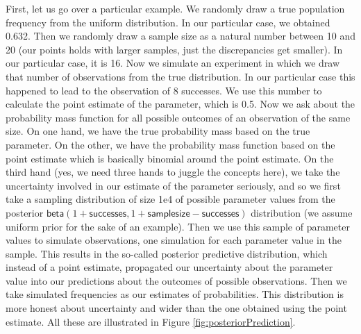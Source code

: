 \documentclass[
  10pt,
  dvipsnames,enabledeprecatedfontcommands]{scrartcl}
\newcommand{\s}[1]{\mbox{$\mathsf{#1}$}}
\begin{document}
First, let us go over a particular example. We randomly draw a true
population frequency from the uniform distribution. In our particular
case, we obtained 0.632. Then we randomly draw a sample size as a
natural number between 10 and 20 (our points holds with larger samples,
just the discrepancies get smaller). In our particular case, it is 16.
Now we simulate an experiment in which we draw that number of
observations from the true distribution. In our particular case this
happened to lead to the observation of 8 successes. We use this number
to calculate the point estimate of the parameter, which is 0.5. Now we
ask about the probability mass function for all possible outcomes of an
observation of the same size. On one hand, we have the true probability
mass based on the true parameter. On the other, we have the probability
mass function based on the point estimate which is basically binomial
around the point estimate. On the third hand (yes, we need three hands
to juggle the concepts here), we take the uncertainty involved in our
estimate of the parameter seriously, and so we first take a sampling
distribution of size 1e4 of possible parameter values from the posterior
\(\s{beta}(1+\s{successes}, 1+\s{sample size} - \s{successes})\)
distribution (we assume uniform prior for the sake of an example). Then
we use this sample of parameter values to simulate observations, one
simulation for each parameter value in the sample. This results in the
so-called posterior predictive distribution, which instead of a point
estimate, propagated our uncertainty about the parameter value into our
predictions about the outcomes of possible observations. Then we take
simulated frequencies as our estimates of probabilities. This
distribution is more honest about uncertainty and wider than the one
obtained using the point estimate. All these are illustrated in Figure
\ref{fig:posteriorPrediction}.
\end{document}
